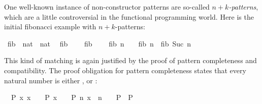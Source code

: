 \begin{isabellebody}
\begin{isamarkuptext}
  One well-known instance of non-constructor patterns are
  so-called \emph{$n+k$-patterns}, which are a little controversial in
  the functional programming world. Here is the initial fibonacci
  example with $n+k$-patterns:%
\end{isamarkuptext}%
\isamarkuptrue%
\isamarkupfalse%
\ fib{}\ {\isacharcolon}{\isacharcolon}\ {\isachardoublequoteopen}nat\ {\isasymRightarrow}\ nat{\isachardoublequoteclose}\isanewline
{}\isanewline
\ \ {\isachardoublequoteopen}fib{}\ {}\ {\isacharequal}\ {}{\isachardoublequoteclose}\isanewline
{\isacharbar}\ {\isachardoublequoteopen}fib{}\ {}\ {\isacharequal}\ {}{\isachardoublequoteclose}\isanewline
{\isacharbar}\ {\isachardoublequoteopen}fib{}\ {\isacharparenleft}n\ {\isacharplus}\ {}{\isacharparenright}\ {\isacharequal}\ fib{}\ n\ {\isacharplus}\ fib{}\ {\isacharparenleft}Suc\ n{\isacharparenright}{\isachardoublequoteclose}\isanewline
%
\isadelimML
%
\endisadelimML
%
\isatagML
%
\endisatagML
{\isafoldML}%
%
\isadelimML
%
\endisadelimML
%
\isadelimproof
%
\endisadelimproof
%
\isatagproof
%
\begin{isamarkuptxt}%
This kind of matching is again justified by the proof of pattern
  completeness and compatibility. 
  The proof obligation for pattern completeness states that every natural number is
  either ,  or :

  \begin{isabelle}%
\ {}{\isachardot}\ {\isasymAnd}P\ x{\isachardot}\ {\isasymlbrakk}x\ {\isacharequal}\ {}\ {\isasymLongrightarrow}\ P{\isacharsemicolon}\ x\ {\isacharequal}\ {}\ {\isasymLongrightarrow}\ P{\isacharsemicolon}\ {\isasymAnd}n{\isachardot}\ x\ {\isacharequal}\ n\ {\isacharplus}\ {}\ {\isasymLongrightarrow}\ P{\isasymrbrakk}\ {\isasymLongrightarrow}\ P%
\end{isabelle}


\end{isamarkuptxt}
\end{isabellebody}

